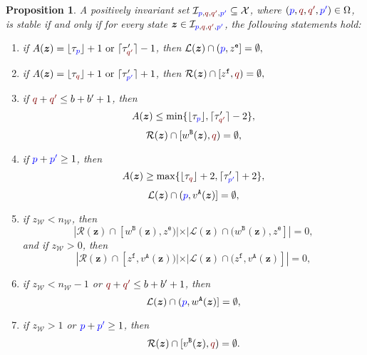\documentclass[10 pt,twocolumn,journal]{IEEEtran}
\DeclarePairedDelimiter{\ceil}{\lceil}{\rceil}
\DeclarePairedDelimiter{\floor}{\lfloor}{\rfloor}
\newtheorem{proposition}{Proposition}
\theoremstyle{plain}
\newcommand{\A}{\mathcal{A}}
\newcommand{\I}{\mathcal{I}}
\newcommand{\X}{\mathcal{X}}
\newcommand{\W}{\mathcal{W}}
\newcommand{\R}{\mathcal{R}}
\renewcommand{\L}{\mathcal{L}}
\newcommand{\z}{\bm{z}}
\newcommand{\p}{\tb{p}}
\newcommand{\pp}{\tb{p'}}
\newcommand{\q}{\tr{q}}
\newcommand{\qq}{\tr{q'}}
\newcommand{\e}{\mathtt{e}}
\newcommand{\f}{\mathtt{f}}
\renewcommand{\A}{\mathtt{A}}
\newcommand{\B}{\mathtt{B}}
\newcommand{\tb}{\textcolor{blue}}
\newcommand{\tr}{\textcolor{Myred}}
\theoremstyle{definition}
\begin{document}
\begin{proposition} \label{th_stability}
    A positively invariant set $\I_{\p,\q,\qq ,\pp }\subseteq\X$, where $(\p,\q,\qq,\pp)\in\Omega$, is stable if and only if for every state $\z\in\I_{\p,\q,\qq ,\pp }$, the following statements hold:
    \begin{enumerate}
        \item if 
            $A(\z)=\floor{\tau_{\p}}+1 \text{ or }\ceil{\tau'_{\qq}}-1$, then
            $\L(\z)\cap(\p,z^{\e}] = \emptyset,$
        \item if
            $A(\z)=\floor{\tau_{\q}}+1 \text{ or } \ceil{\tau'_{\pp}}+1$, then
            $\R(\z)\cap[z^{\f},\q) = \emptyset,$
        \item if $\q+\qq\leq b+b'+1$, then 
        \begin{equation} \label{stabilityTheorem_e1}
            A(\z) \leq     \min\{\floor{\tau_{\p}},\ceil{\tau'_{\qq}}-2\},
        \end{equation}
        \begin{equation} \label{stabilityTheorem_e2}
            \R(\z)\cap[w^{\B}(\z),\q) = \emptyset,
        \end{equation}
        \item if $\p+\pp\geq 1$, then 
        \begin{equation} \label{stabilityTheorem_e3}
            A(\z) \geq \max\{\floor{\tau_{\q}}+2,\ceil{\tau'_{\pp }}+2\},
        \end{equation}
        \begin{equation}\label{stabilityTheorem_e4}
            \L(\z)\cap(\p,v^{\A}(\z)] = \emptyset,
        \end{equation}
        \item if $z_\W<n_\W$, then
        $$
        |\R(\z)\cap[w^{\B}(\z),z^{\e})| \times |\L(\z)\cap(w^{\B}(\z),z^{\e}]| = 0,
        $$
        and if $z_\W>0$, then
        $$ %
         |\R(\z)\cap[z^{\f},v^{\A}(\z))| \times |\L(\z)\cap(z^{\f},v^{\A}(\z)]| = 0,
        $$
        \item 
        if $z_\W<n_\W-1$ or $\q+\qq\leq b+b'+1$, then
        \begin{equation}\label{stabilityTheorem_e5}
        \L(\z)\cap(\p,w^{\A}(\z)] = \emptyset,
        \end{equation}
        \item 
        if $z_\W>1$ or $\p+\pp\geq 1$, then
        \begin{equation} \label{stabilityTheorem_e6}
            \R(\z)\cap[v^{\B}(\z),\q) = \emptyset.
        \end{equation}      %
    \end{enumerate}
\end{proposition}
\end{document}

